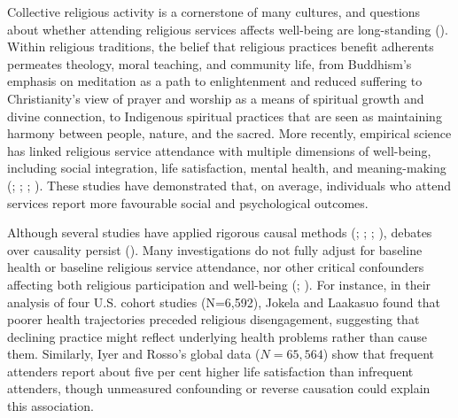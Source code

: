 \documentclass[
  single column]{article}
\begin{document}
Collective religious activity is a cornerstone of many cultures, and
questions about whether attending religious services affects well-being
are long-standing (). Within religious traditions, the belief that religious
practices benefit adherents permeates theology, moral teaching, and
community life, from Buddhism's emphasis on meditation as a path to
enlightenment and reduced suffering to Christianity's view of prayer and
worship as a means of spiritual growth and divine connection, to
Indigenous spiritual practices that are seen as maintaining harmony
between people, nature, and the sacred. More recently, empirical science
has linked religious service attendance with multiple dimensions of
well-being, including social integration, life satisfaction, mental
health, and meaning-making (; ;
;
). These studies have demonstrated that, on average, individuals
who attend services report more favourable social and psychological
outcomes.

Although several studies have applied rigorous causal methods
(;
;
; ), debates over causality persist
().
Many investigations do not fully adjust for baseline health or baseline
religious service attendance, nor other critical confounders affecting
both religious participation and well-being
(;
). For
instance, in their analysis of four U.S. cohort studies (N=6,592),
Jokela and Laakasuo found that poorer health trajectories preceded
religious disengagement, suggesting that declining practice might
reflect underlying health problems rather than cause them. Similarly,
Iyer and Rosso's global data (\(N=65,564\)) show that frequent attenders
report about five per cent higher life satisfaction than infrequent
attenders, though unmeasured confounding or reverse causation could
explain this association.
\end{document}

